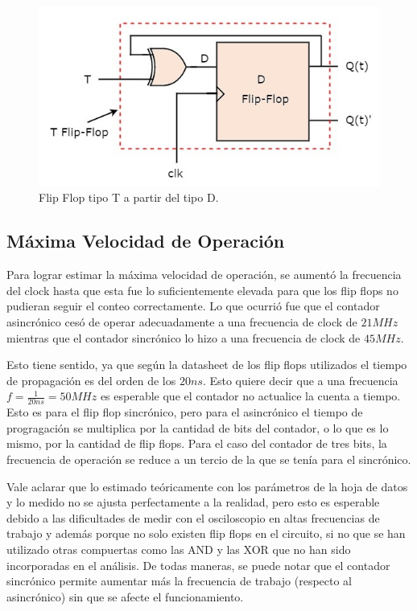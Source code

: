 \begin{figure}[H]
\centering
\includegraphics[scale=0.4]{TflipflopWithD.PNG}
\caption{Flip Flop tipo T a partir del tipo D.}
\end{figure}


\subsection{Máxima Velocidad de Operación}

Para lograr estimar la máxima velocidad de operación, se aumentó la
frecuencia del clock hasta que esta fue lo suficientemente elevada
para que los flip flops no pudieran seguir el conteo correctamente.
Lo que ocurrió fue que el contador asincrónico cesó de operar adecuadamente
a una frecuencia de clock de $21MHz$ mientras que el contador sincrónico
lo hizo a una frecuencia de clock de $45MHz$.

Esto tiene sentido, ya que según la datasheet de los flip flops utilizados
el tiempo de propagación es del orden de los $20ns$. Esto quiere
decir que a una frecuencia $f=\frac{1}{20ns}=50MHz$ es esperable
que el contador no actualice la cuenta a tiempo. Esto es para el flip
flop sincrónico, pero para el asincrónico el tiempo de progragación
se multiplica por la cantidad de bits del contador, o lo que es lo
mismo, por la cantidad de flip flops. Para el caso del contador de
tres bits, la frecuencia de operación se reduce a un tercio de la
que se tenía para el sincrónico.

Vale aclarar que lo estimado teóricamente con los parámetros de la
hoja de datos y lo medido no se ajusta perfectamente a la realidad, pero esto es
esperable debido a las dificultades de medir con el osciloscopio en
altas frecuencias de trabajo y además porque no solo existen flip
flops en el circuito, si no que se han utilizado otras compuertas
como las AND y las XOR que no han sido incorporadas en el análisis. De
todas maneras, se puede notar que el contador sincrónico permite aumentar
más la frecuencia de trabajo (respecto al asincrónico)
sin que se afecte el funcionamiento.